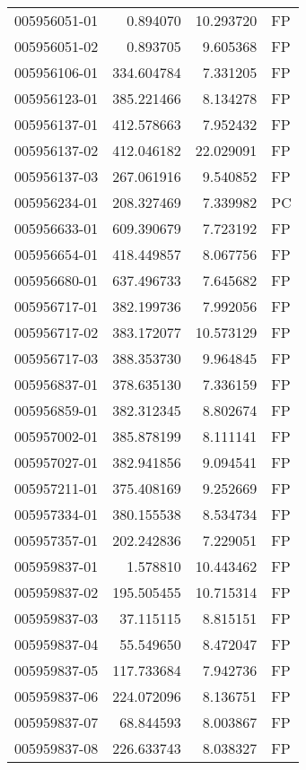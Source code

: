 \begin{tabular}{lrrl}
005956051-01 &    0.894070 &    10.293720 &   FP \\
005956051-02 &    0.893705 &     9.605368 &   FP \\
005956106-01 &  334.604784 &     7.331205 &   FP \\
005956123-01 &  385.221466 &     8.134278 &   FP \\
005956137-01 &  412.578663 &     7.952432 &   FP \\
005956137-02 &  412.046182 &    22.029091 &   FP \\
005956137-03 &  267.061916 &     9.540852 &   FP \\
005956234-01 &  208.327469 &     7.339982 &   PC \\
005956633-01 &  609.390679 &     7.723192 &   FP \\
005956654-01 &  418.449857 &     8.067756 &   FP \\
005956680-01 &  637.496733 &     7.645682 &   FP \\
005956717-01 &  382.199736 &     7.992056 &   FP \\
005956717-02 &  383.172077 &    10.573129 &   FP \\
005956717-03 &  388.353730 &     9.964845 &   FP \\
005956837-01 &  378.635130 &     7.336159 &   FP \\
005956859-01 &  382.312345 &     8.802674 &   FP \\
005957002-01 &  385.878199 &     8.111141 &   FP \\
005957027-01 &  382.941856 &     9.094541 &   FP \\
005957211-01 &  375.408169 &     9.252669 &   FP \\
005957334-01 &  380.155538 &     8.534734 &   FP \\
005957357-01 &  202.242836 &     7.229051 &   FP \\
005959837-01 &    1.578810 &    10.443462 &   FP \\
005959837-02 &  195.505455 &    10.715314 &   FP \\
005959837-03 &   37.115115 &     8.815151 &   FP \\
005959837-04 &   55.549650 &     8.472047 &   FP \\
005959837-05 &  117.733684 &     7.942736 &   FP \\
005959837-06 &  224.072096 &     8.136751 &   FP \\
005959837-07 &   68.844593 &     8.003867 &   FP \\
005959837-08 &  226.633743 &     8.038327 &   FP \\

\end{tabular}
